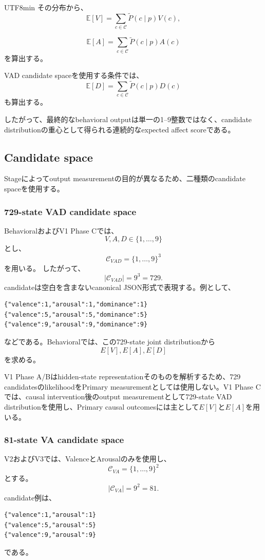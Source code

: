 \documentclass{article} %
\begin{document}
\begin{CJK*}{UTF8}{min}
その分布から、
\[
\mathbb{E}[V]
=
\sum_{c\in\mathcal{C}}
\tilde{P}(c\mid p)V(c),
\]

\[
\mathbb{E}[A]
=
\sum_{c\in\mathcal{C}}
\tilde{P}(c\mid p)A(c)
\]
を算出する。

VAD candidate spaceを使用する条件では、
\[
\mathbb{E}[D]
=
\sum_{c\in\mathcal{C}}
\tilde{P}(c\mid p)D(c)
\]
も算出する。

したがって、最終的なbehavioral outputは単一の1--9整数ではなく、candidate distributionの重心として得られる連続的なexpected affect scoreである。


\subsection{Candidate space}
\label{app:candidate_spaces}

Stageによってoutput measurementの目的が異なるため、二種類のcandidate spaceを使用する。


\subsubsection{729-state VAD candidate space}

BehavioralおよびV1 Phase Cでは、
\[
V,A,D
\in
\{1,\ldots,9\}
\]
とし、
\[
\mathcal{C}_{VAD}
=
\{1,\ldots,9\}^3
\]
を用いる。
したがって、
\[
|\mathcal{C}_{VAD}|
=
9^3
=
729.
\]
candidateは空白を含まないcanonical JSON形式で表現する。例として、

\begin{verbatim}
{"valence":1,"arousal":1,"dominance":1}
{"valence":5,"arousal":5,"dominance":5}
{"valence":9,"arousal":9,"dominance":9}
\end{verbatim}

などである。Behavioralでは、この729-state joint distributionから
\[
E[V],E[A],E[D]
\]
を求める。

V1 Phase A/Bはhidden-state representationそのものを解析するため、729 candidatesのlikelihoodをPrimary measurementとしては使用しない。V1 Phase Cでは、causal intervention後のoutput measurementとして729-state VAD distributionを使用し、Primary causal outcomesには主として\(E[V]\)と\(E[A]\)を用いる。


\subsubsection{81-state VA candidate space}

V2およびV3では、ValenceとArousalのみを使用し、
\[
\mathcal{C}_{VA}
=
\{1,\ldots,9\}^2
\]
とする。
\[
|\mathcal{C}_{VA}|
=
9^2
=
81.
\]
candidate例は、
\begin{verbatim}
{"valence":1,"arousal":1}
{"valence":5,"arousal":5}
{"valence":9,"arousal":9}
\end{verbatim}
である。


\end{CJK*}
\end{document}
